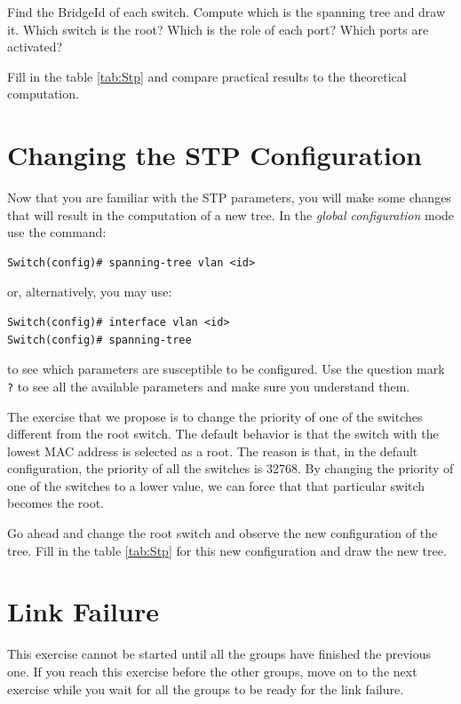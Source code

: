 {\color{red}Find the BridgeId of each switch.
Compute which is the spanning tree and draw it.
Which switch is the root?
Which is the role of each port?
Which ports are activated?

Fill in the table \ref{tab:Stp} and compare practical results to the theoretical computation.}

\section{Changing the STP Configuration}

Now that you are familiar with the STP parameters, you will make some changes that will result in the computation of a new tree. In the \emph{global configuration} mode use the command:

\begin{lstlisting}
Switch(config)# spanning-tree vlan <id>
\end{lstlisting}
or, alternatively, you may use:

\begin{lstlisting}
Switch(config)# interface vlan <id>
Switch(config)# spanning-tree
\end{lstlisting}
to see which parameters are susceptible to be configured. Use the question mark \texttt{\color{blue}?} to see all the available parameters and make sure you understand them.

The exercise that we propose is to change the priority of one of the switches different from the root switch. The default behavior is that the switch with the lowest MAC address is selected as a root. The reason is that, in the default configuration, the priority of all the switches is 32768. By changing the priority of one of the switches to a lower value, we can force that that particular switch becomes the root.

Go ahead and change the root switch and observe the new configuration of the tree. Fill in the table \ref{tab:Stp} for this new configuration and draw the new tree.

\section{Link Failure}

This exercise cannot be started until all the groups have finished the previous one. If you reach this exercise before the other groups, move on to the next exercise while you wait for all the groups to be ready for the link failure.

